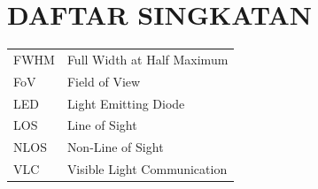 \chapter*{DAFTAR SINGKATAN}

\begin{center}
	\centering
\begin{tabular}{ll}
	FWHM & Full Width at Half Maximum\\
	FoV & Field of View\\
	LED & Light Emitting Diode\\
	LOS & Line of Sight\\
	NLOS & Non-Line of Sight\\
	VLC & Visible Light Communication\\
	
	




\end{tabular}
\end{center}